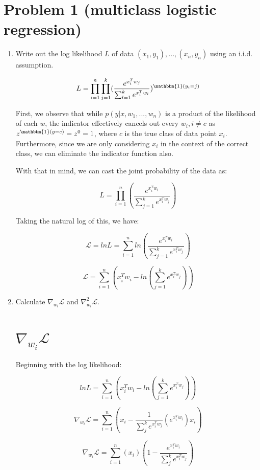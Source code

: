\documentclass[11pt]{article}
\begin{document}

\section*{Problem 1 (multiclass logistic regression)}

\begin{enumerate}
\item Write out the log likelihood $L$ of data $(x_1, y_1), . . . , (x_n, y_n)$ using an i.i.d. assumption.

\[
L = \prod_{i=1}^{n} \prod_{j=1}^{k} (\frac{e^{x_i^Tw_j}}{\sum_{l=1}^k e^{x_i^Tw_l}})^{\mathbbm{1}(y_i = j)}
\]

First, we observe that while $p(y|x, w_1, ..., w_n)$ is a product of the likelihood of each $w$, the indicator effectively cancels out every $w_i, i \neq c$ as $z^{\mathbbm{1}(y = c)} = z^0 = 1$, where $c$ is the true class of data point $x_i$. Furthermore, since we are only considering $x_i$ in the context of the correct class, we can eliminate the indicator function also.

With that in mind, we can cast the joint probability of the data as:

\[
L = \prod_{i=1}^{n} (\frac{e^{x_i^Tw_i}}{\sum_{j=1}^k e^{x_i^Tw_j}})
\]

Taking the natural log of this, we have:

\[
\mathcal{L} = lnL = \sum_{i=1}^{n} ln(\frac{e^{x_i^Tw_i}}{\sum_{j=1}^k e^{x_i^Tw_j}})
\]

\[
\mathcal{L} = \sum_{i=1}^{n} (x_i^Tw_i - ln({\sum_{j=1}^k e^{x_i^Tw_j}}))
\]

\item Calculate $\nabla_{w_i} \mathcal{L}$ and $\nabla^2_{w_i} \mathcal{L}$.

\section*{$\nabla_{w_i} \mathcal{L}$}

Beginning with the log likelihood:

\[
lnL = \sum_{i=1}^{n} (x_i^Tw_i - ln({\sum_{j=1}^k e^{x_i^Tw_j}}))
\]

\[
\nabla_{w_i}\mathcal{L} = \sum_{i=1}^{n} (x_i - \frac{1}{\sum_j^k e^{x_i^Tw_j}} (e^{x_i^Tw_i}) x_i)
\]

\[
\nabla_{w_i}\mathcal{L} = \sum_{i=1}^{n}(x_i) (1 - \frac{e^{x_i^Tw_i}}{\sum_j^k e^{x_i^Tw_j}})
\]


\end{enumerate}
\end{document}
